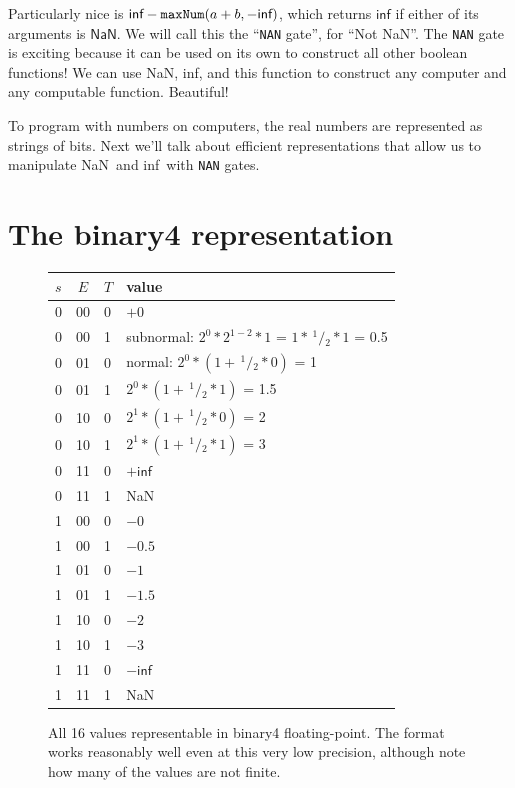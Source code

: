 \documentclass[twocolumn,cm]{article}
\newcommand\sfrac[2]{\!{}\,^{#1}\!/{}\!_{#2}}
\newcommand\nan{\textsf{NaN}}
\renewcommand\inf{\textsf{inf}}
\begin{document}
Particularly nice is $\inf - {\tt maxNum}(a + b, -\inf)$, which
returns $\inf$ if either of its arguments is $\nan$. We will call this
the ``{\tt NAN} gate'', for ``Not \nan''. The {\tt NAN} gate is
exciting because it can be used on its own to construct all other
boolean functions! We can use \nan, \inf, and this function to
construct any computer and any computable function. Beautiful!

To program with numbers on computers, the real numbers are
represented as strings of bits. Next we'll talk about efficient
representations that allow us to manipulate \nan\ and \inf\ 
with {\tt NAN} gates.

\section{The binary4 representation} \label{sec:representation}


\begin{figure}[ht]
\begin{center}
  \begin{tabular}{|l@{\,}c@{\,}l|p{2.5in}|}
\hline
  $s$ & $E$ & $T$ & value \\
  \hline
0 & 00 & 0 &   $+0$ \\
0 & 00 & 1 &    subnormal: %
                $2^0 * 2^{1-2} * 1$ =
                $1 * \sfrac{1}{2} * 1$ = 0.5 \\
0 & 01 & 0 &    normal: %
                $2^0 * (1 + \sfrac{1}{2} * 0)$ = 1 \\
0 & 01 & 1 &    $2^0 * (1 + \sfrac{1}{2} * 1)$ = 1.5 \\
0 & 10 & 0 &    $2^1 * (1 + \sfrac{1}{2} * 0)$ = 2 \\
0 & 10 & 1 &    $2^1 * (1 + \sfrac{1}{2} * 1)$ = 3 \\
0 & 11 & 0 &   $+\inf$ \\
0 & 11 & 1 &    \nan \\
1 & 00 & 0 &   $-0$ \\
1 & 00 & 1 &   $-0.5$ \\
1 & 01 & 0 &   $-1$ \\ 
1 & 01 & 1 &   $-1.5$ \\
1 & 10 & 0 &   $-2$ \\
1 & 10 & 1 &   $-3$ \\ 
1 & 11 & 0 &   $-\inf$ \\
1 & 11 & 1 &    \nan \\
\hline
\end{tabular}
\end{center}
  \caption{All 16 values representable in binary4 floating-point.
  The format works reasonably well even at this very low precision,
  although note how many of the values are not finite.} \label{fig:allvalues4}
\end{figure}
\end{document}
